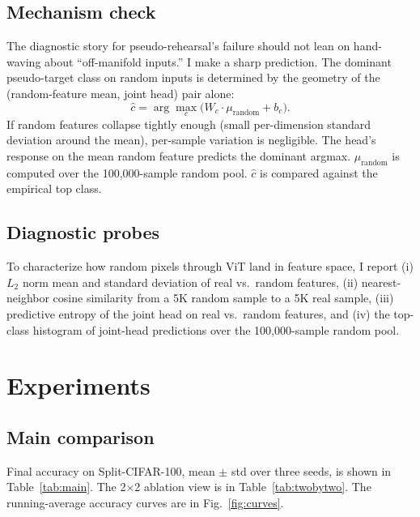 \documentclass[conference]{IEEEtran}
\begin{document}
\subsection{Mechanism check}

The diagnostic story for pseudo-rehearsal's failure should not lean on
hand-waving about ``off-manifold inputs.'' I make a sharp prediction. The
dominant pseudo-target class on random inputs is determined by the
geometry of the (random-feature mean, joint head) pair alone:
\begin{equation}
\hat{c} = \arg\max_c \bigl( W_c \cdot \mu_{\text{random}} + b_c \bigr).
\label{eq:mechanism}
\end{equation}
If random features collapse tightly enough (small per-dimension standard
deviation around the mean), per-sample variation is negligible. The
head's response on the mean random feature predicts the dominant argmax.
$\mu_{\text{random}}$ is computed over the 100{,}000-sample random pool.
$\hat{c}$ is compared against the empirical top class.

\subsection{Diagnostic probes}

To characterize how random pixels through ViT land in feature space, I
report (i) $L_2$ norm mean and standard deviation of real vs.\ random
features, (ii) nearest-neighbor cosine similarity from a 5K random sample
to a 5K real sample, (iii) predictive entropy of the joint head on real vs.\
random features, and (iv) the top-class histogram of joint-head predictions
over the 100{,}000-sample random pool.

\section{Experiments}\label{sec:experiments}

\subsection{Main comparison}

Final accuracy on Split-CIFAR-100, mean $\pm$ std over three seeds, is
shown in Table~\ref{tab:main}. The 2$\times$2 ablation view is in
Table~\ref{tab:twobytwo}. The running-average accuracy curves are in
Fig.~\ref{fig:curves}.
\end{document}
